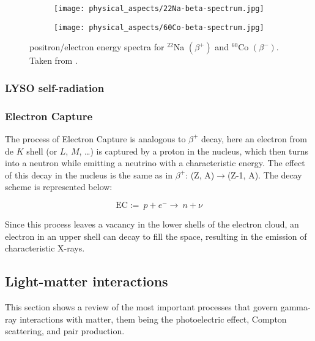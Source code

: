 \begin{figure}[H]
    \centering
    \begin{subfigure}[t]{0.45\textwidth}
      \texttt{[image: physical\_aspects/22Na-beta-spectrum.jpg]}
      \caption{\label{sfig:22Na_beta_spectra}}
    \end{subfigure}
    \begin{subfigure}[t]{0.45\textwidth}
      \texttt{[image: physical\_aspects/60Co-beta-spectrum.jpg]}
      \caption{\label{sfig:60Co_beta_spectra}}
    \end{subfigure}
    \caption{\label{fig:beta_spectra}positron/electron energy spectra for   $^{22}$Na $(\beta^+)$ and   $^{60}$Co $(\beta^-)$. Taken from \cite{IAEA}.}
\end{figure}

\subsubsection{LYSO self-radiation}\label{sec:self_radiation}

\subsubsection{Electron Capture}

The process of Electron Capture is analogous to $\beta^+$ decay, here an electron from de $K$ shell (or $L$, $M$, \dots) is captured by a proton in the nucleus, which then turns into a neutron while emitting a neutrino with a characteristic energy. The effect of this decay in the nucleus is the same as in $\beta^+$: (Z, A)$\rightarrow$(Z-1, A). The decay scheme is represented below:

\begin{equation}
  \text{EC} :=~ p + e^- \rightarrow ~ n + \nu
\end{equation}

Since this process leaves a vacancy in the lower shells of the electron cloud, an electron in an upper shell can decay to fill the space, resulting in the emission of characteristic X-rays.

\subsection{Light-matter interactions}

This section shows a review of the most important processes that govern gamma-ray interactions with matter, them being the photoelectric effect, Compton scattering, and pair production.

